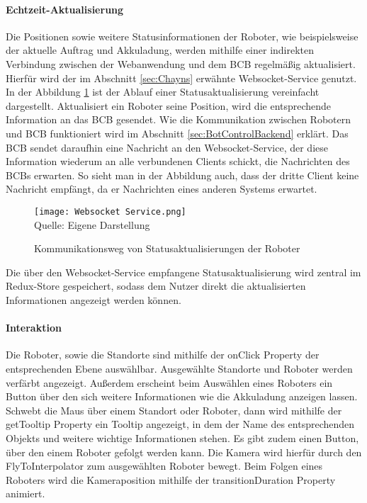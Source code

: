 \paragraph{Echtzeit-Aktualisierung}
Die Positionen sowie weitere Statusinformationen der Roboter, wie beispielsweise der aktuelle Auftrag und Akkuladung, werden mithilfe einer indirekten Verbindung zwischen der Webanwendung und dem \ac{BCB} regelmäßig aktualisiert. Hierfür wird der im Abschnitt \ref{sec:Chayns} erwähnte \gls{Websocket}-Service genutzt. In der Abbildung \ref{fig:RobotStatusUpdate} ist der Ablauf einer Statusaktualisierung vereinfacht dargestellt. Aktualisiert ein Roboter seine Position, wird die entsprechende Information an das \ac{BCB} gesendet. Wie die Kommunikation zwischen Robotern und \ac{BCB} funktioniert wird im Abschnitt \ref{sec:BotControlBackend} erklärt. Das \ac{BCB} sendet daraufhin eine Nachricht an den \gls{Websocket}-Service, der diese Information wiederum an alle verbundenen Clients schickt, die Nachrichten des \ac{BCB}s erwarten. So sieht man in der Abbildung auch, dass der dritte Client keine Nachricht empfängt, da er Nachrichten eines anderen Systems erwartet.

\begin{figure}[H]
    \centering
    \caption{Kommunikationsweg von Statusaktualisierungen der Roboter}\label{fig:RobotStatusUpdate}
    \texttt{[image: Websocket Service.png]}
    \\
    Quelle: Eigene Darstellung
\end{figure}

Die über den \gls{Websocket}-Service empfangene Statusaktualisierung wird zentral im Redux-Store gespeichert, sodass dem Nutzer direkt die aktualisierten Informationen angezeigt werden können.

\paragraph{Interaktion}
Die Roboter, sowie die Standorte sind mithilfe der onClick Property der entsprechenden Ebene \cite{DeckglInteractivity} auswählbar. Ausgewählte Standorte und Roboter werden verfärbt angezeigt. Außerdem erscheint beim Auswählen eines Roboters ein Button über den sich weitere Informationen wie die Akkuladung anzeigen lassen. Schwebt die Maus über einem Standort oder Roboter, dann wird mithilfe der getTooltip Property \cite{DeckglDeckClass} ein Tooltip angezeigt, in dem der Name des entsprechenden Objekts und weitere wichtige Informationen stehen. Es gibt zudem einen Button, über den einem Roboter gefolgt werden kann. Die Kamera wird hierfür durch den FlyToInterpolator \cite{DeckglFlyToInterpolator} zum ausgewählten Roboter bewegt. Beim Folgen eines Roboters wird die Kameraposition mithilfe der transitionDuration Property \cite{DeckglAnimationsAndTransitions} animiert.

